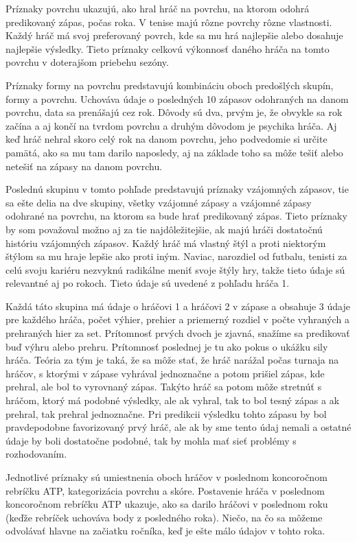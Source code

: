 Príznaky povrchu ukazujú, ako hral hráč na povrchu, na ktorom odohrá predikovaný zápas, počas roka. V tenise majú rôzne povrchy rôzne vlastnosti. Každý hráč má svoj preferovaný povrch, kde sa mu hrá najlepšie alebo dosahuje najlepšie výsledky. Tieto príznaky celkovú výkonnosť daného hráča na tomto povrchu v doterajšom priebehu sezóny.

Príznaky formy na povrchu predstavujú kombináciu oboch predošlých skupín, formy a povrchu. Uchováva údaje o posledných 10 zápasov odohraných na danom povrchu, data sa prenášajú cez rok. Dôvody sú dva, prvým je, že obvykle sa rok začína a aj končí na tvrdom povrchu a druhým dôvodom je psychika hráča. Aj keď hráč nehral skoro celý rok na danom povrchu, jeho podvedomie si určite pamätá, ako sa mu tam darilo naposledy, aj na základe toho sa môže tešiť alebo netešiť na zápasy na danom povrchu.

Poslednú skupinu v tomto pohľade predstavujú príznaky vzájomných zápasov, tie sa ešte delia na dve skupiny, všetky vzájomné zápasy a vzájomné zápasy odohrané na povrchu, na ktorom sa bude hrať predikovaný zápas. 
Tieto príznaky by som považoval možno aj za tie najdôležitejšie, ak majú hráči dostatočnú históriu vzájomných zápasov.
Každý hráč má vlastný štýl a proti niektorým štýlom sa mu hraje lepšie ako proti iným. Naviac, narozdiel od futbalu, tenisti za celú svoju kariéru nezvyknú radikálne meniť svoje štýly hry, takže tieto údaje sú relevantné aj po rokoch.
Tieto údaje sú uvedené z pohľadu hráča 1.

Každá táto skupina má údaje o hráčovi 1 a hráčovi 2 v zápase a obsahuje 3 údaje pre každého hráča, počet výhier, prehier a priemerný rozdiel v počte vyhraných a prehraných hier za set. Prítomnosť prvých dvoch je zjavná, snažíme sa predikovať buď výhru alebo prehru. 
Prítomnosť poslednej je tu ako pokus o ukážku sily hráča. 
Teória za tým je taká, že sa môže stať, že hráč narážal počas turnaja na hráčov, s ktorými v zápase vyhrával jednoznačne a potom prišiel zápas, kde prehral, ale bol to vyrovnaný zápas. 
Takýto hráč sa potom môže stretnúť s hráčom, ktorý má podobné výsledky, ale ak vyhral, tak to bol tesný zápas a ak prehral, tak prehral jednoznačne.
Pri predikcii výsledku tohto zápasu by bol pravdepodobne favorizovaný prvý hráč, ale ak by sme tento údaj nemali a ostatné údaje by boli dostatočne podobné, tak by mohla mať sieť problémy s rozhodovaním.

Jednotlivé príznaky sú umiestnenia oboch hráčov v poslednom koncoročnom rebríčku ATP, kategorizácia povrchu a skóre.
Postavenie hráča v poslednom koncoročnom rebríčku ATP ukazuje, ako sa darilo hráčovi v poslednom roku (keďže rebríček uchováva body z posledného roka). Niečo, na čo sa môžeme odvolávať hlavne na začiatku ročníka, keď je ešte málo údajov v tohto roka.

